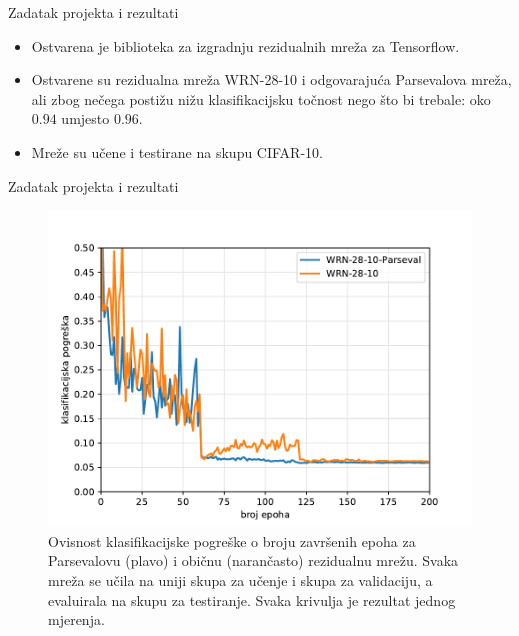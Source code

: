 \documentclass{beamer}
\begin{document}
\begin{frame}{Zadatak projekta i rezultati}
\begin{itemize}
	\item Ostvarena je biblioteka za izgradnju rezidualnih mreža za Tensorflow.
	\item Ostvarene su rezidualna mreža WRN-28-10 i odgovarajuća Parsevalova mreža, ali zbog nečega postižu nižu klasifikacijsku točnost nego što bi trebale: oko $0.94$ umjesto $0.96$.
	\item Mreže su učene i testirane na skupu CIFAR-10.
\end{itemize}
\end{frame}

\begin{frame}{Zadatak projekta i rezultati}
\begin{figure}[htbp]
	\centering
	\includegraphics[width=0.65\linewidth]{ilustracije/grafovi/krivulje-pogreske}
	\caption{
		Ovisnost klasifikacijske pogreške o broju završenih epoha za Parsevalovu (plavo) i običnu (narančasto) rezidualnu mrežu. Svaka mreža se učila na uniji skupa za učenje i skupa za validaciju, a evaluirala na skupu za testiranje. Svaka krivulja je rezultat jednog mjerenja.
	}
	\label{fig:krivulje-pogreske-moje}
\end{figure}
\end{frame}
\end{document}
